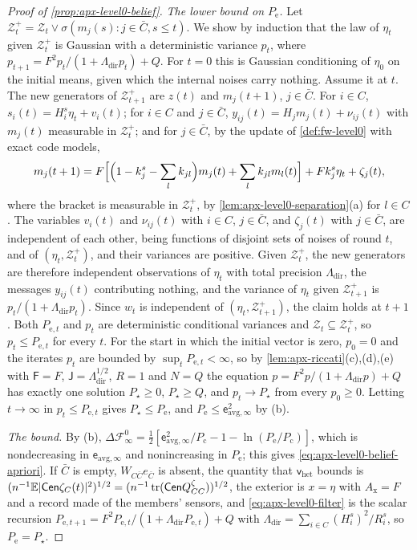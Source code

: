 \begin{proof}[Proof of \cref{prop:apx-level0-belief}]
\emph{The lower bound on $P_{\mathrm e}$.} Let $\mathcal Z^+_t=\mathcal Z_t\vee\sigma(m_j(s):j\in\bar C,s\le t)$. We show by induction that the law of $\eta_t$ given $\mathcal Z^+_t$ is Gaussian with a deterministic variance $p_t$, where $p_{t+1}=F^2p_t/(1+\Lambda_{\mathrm{dir}} p_t)+Q$. For $t=0$ this is Gaussian conditioning of $\eta_0$ on the initial means, given which the internal noises carry nothing. Assume it at $t$. The new generators of $\mathcal Z^+_{t+1}$ are $z(t)$ and $m_j(t+1)$, $j\in\bar C$. For $i\in C$, $s_i(t)=H^s_i\eta_t+v_i(t)$; for $i\in C$ and $j\in\bar C$, $y_{ij}(t)=H_jm_j(t)+\nu_{ij}(t)$ with $m_j(t)$ measurable in $\mathcal Z^+_t$; and for $j\in\bar C$, by the update of \cref{def:fw-level0} with exact code models,
\begin{equation*}
m_j(t+1)=F\Bigl[\Bigl(1-k^s_j-\sum_lk_{jl}\Bigr)m_j(t)+\sum_lk_{jl}m_l(t)\Bigr]+Fk^s_j\eta_t+\zeta_j(t),
\end{equation*}
where the bracket is measurable in $\mathcal Z^+_t$, by \cref{lem:apx-level0-separation}(a) for $l\in C$. The variables $v_i(t)$ and $\nu_{ij}(t)$ with $i\in C$, $j\in\bar C$, and $\zeta_j(t)$ with $j\in\bar C$, are independent of each other, being functions of disjoint sets of noises of round $t$, and of $(\eta_t,\mathcal Z^+_t)$, and their variances are positive. Given $\mathcal Z^+_t$, the new generators are therefore independent observations of $\eta_t$ with total precision $\Lambda_{\mathrm{dir}}$, the messages $y_{ij}(t)$ contributing nothing, and the variance of $\eta_t$ given $\mathcal Z^+_{t+1}$ is $p_t/(1+\Lambda_{\mathrm{dir}} p_t)$. Since $w_t$ is independent of $(\eta_t,\mathcal Z^+_{t+1})$, the claim holds at $t+1$. Both $P_{\mathrm e,t}$ and $p_t$ are deterministic conditional variances and $\mathcal Z_t\subseteq\mathcal Z^+_t$, so $p_t\le P_{\mathrm e,t}$ for every $t$. For the start in which the initial vector is zero, $p_0=0$ and the iterates $p_t$ are bounded by $\sup_tP_{\mathrm e,t}<\infty$, so by \cref{lem:apx-riccati}(c),(d),(e) with $\mathsf F=F$, $\mathsf J=\Lambda_{\mathrm{dir}}^{1/2}$, $R=1$ and $N=Q$ the equation $p=F^2p/(1+\Lambda_{\mathrm{dir}} p)+Q$ has exactly one solution $P_\star\ge0$, $P_\star\ge Q$, and $p_t\to P_\star$ from every $p_0\ge0$. Letting $t\to\infty$ in $p_t\le P_{\mathrm e,t}$ gives $P_\star\le P_{\mathrm e}$, and $P_{\mathrm e}\le\mathsf e_{\mathrm{avg},\infty}^2$ by (b).

\emph{The bound.} By (b), $\Delta\mathcal F^0_\infty=\frac12[\mathsf e_{\mathrm{avg},\infty}^2/P_{\mathrm c}-1-\ln(P_{\mathrm e}/P_{\mathrm c})]$, which is nondecreasing in $\mathsf e_{\mathrm{avg},\infty}$ and nonincreasing in $P_{\mathrm e}$; this gives \eqref{eq:apx-level0-belief-apriori}. If $\bar C$ is empty, $W_{C\bar C}e_{\bar C}$ is absent, the quantity that $\mathsf v_{\mathrm{het}}$ bounds is $(n^{-1}\mathbb{E}\lvert\mathsf{Cen}\zeta_C(t)\rvert^2)^{1/2}=(n^{-1}\operatorname{tr}(\mathsf{Cen}Q^\zeta_{CC}))^{1/2}$, the exterior is $x=\eta$ with $A_{\mathrm x}=F$ and a record made of the members' sensors, and \eqref{eq:apx-level0-filter} is the scalar recursion $P_{\mathrm e,t+1}=F^2P_{\mathrm e,t}/(1+\Lambda_{\mathrm{dir}} P_{\mathrm e,t})+Q$ with $\Lambda_{\mathrm{dir}}=\sum_{i\in C}(H^s_i)^2/R^s_i$, so $P_{\mathrm e}=P_\star$.


\end{proof}
